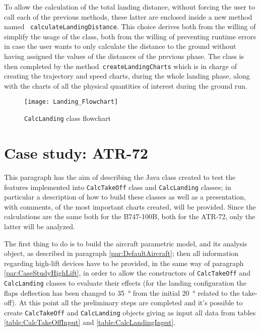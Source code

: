 \bigskip
\noindent
To allow the calculation of the total landing distance, without forcing the user to call each of the previous methods, these latter are enclosed inside a new method named ~\lstinline[language=Java]!calculateLandingDistance!. This choice derives both from the willing of simplify the usage of the class, both from the willing of preventing runtime errors in case the user wants to only calculate the distance to the ground without having assigned the values of the distances of the previous phase. The class is then completed by the method~\lstinline[language=Java]!createLandingCharts! which is in charge of creating the trajectory and speed charts, during the whole landing phase, along with the charts of all the physical quantities of interest during the ground run.
%
\begin{figure}[H]
\centering
\texttt{[image: Landing\_Flowchart]}
\caption{\lstinline[language=Java]!CalcLanding! class flowchart}
\label{fig:CalcLandingFlowchart}
\end{figure}
%
\section{Case study: ATR-72}
This paragraph has the aim of describing the Java class created to test the features implemented into \lstinline[language=Java]!CalcTakeOff! class and \lstinline[language=Java]!CalcLanding! classes; in particular a description of how to build these classes as well as a presentation, with comments, of the most important charts created, will be provided. 
%
Since the calculations are the same both for the B747-100B, both for the ATR-72, only the latter will be analyzed. 

\bigskip
\noindent
The first thing to do is to build the aircraft parametric model, and its analysis object, as described in paragraph \ref{par:DefaultAircraft}; then all information regarding high-lift devices have to be provided, in the same way of paragraph \ref{par:CaseStudyHighLift}, in order to allow the constructors of \lstinline[language=Java]!CalcTakeOff! and \lstinline[language=Java]!CalcLanding! classes to evaluate their effects (for the landing configuration the flaps deflection has been changed to \SI{35}{\degree} from the initial \SI{20}{\degree} related to the take-off). 
%
At this point all the preliminary steps are completed and it's possible to create \lstinline[language=Java]!CalcTakeOff! and \lstinline[language=Java]!CalcLanding! objects giving as input all data from tables \ref{table:CalcTakeOffInput} and \ref{table:CalcLandingInput}.

